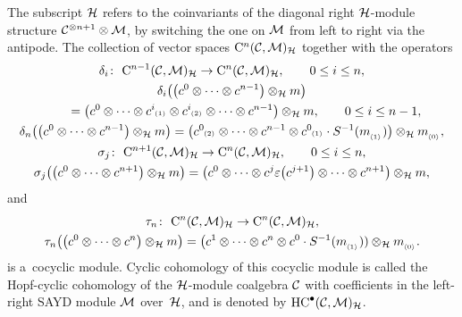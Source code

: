 \documentclass[pdftex]{sigma}
\numberwithin{equation}{section}
\newcommand{\ps}[1]{~\hspace{-4pt}_{^{(#1)}}}
\newcommand{\ns}[1]{~\hspace{-4pt}_{_{{\langle#1\rangle}}}}
\begin{document}
{\sloppy The subscript ${\cal H}$ refers to the coinvariants of the diagonal right ${\cal H}$-module structure \mbox{${\cal C}^{\otimes
n+1}\otimes{\cal M}$}, by switching the one on ${\cal M}$ from left to right via the antipode.
The collection of vector spaces ${\rm C}^n({\cal C},{\cal M})_{{\cal H}}$ together with the operators
\begin{gather*}
\delta_i\colon \ {\rm C}^{n-1}({\cal C},{\cal M})_{{\cal H}} \to {\rm C}^n({\cal C},{\cal M})_{{\cal H}},
\qquad
0 \leq i \leq n,
\\
\delta_i\big(\big(c^0 \otimes \cdots \otimes c^{n-1}\big) \otimes_{{\cal H}} m\big) \\
\qquad{} =\big(c^0 \otimes \cdots \otimes c^i\ps{1} \otimes
c^i\ps{2} \otimes \cdots \otimes c^{n-1}\big) \otimes_{{\cal H}} m,
\qquad
0 \leq i \leq n-1,
\\
\delta_n\big(\big(c^0 \otimes \cdots \otimes c^{n-1}\big) \otimes_{{\cal H}} m\big) =\big(c^0\ps{2} \otimes \cdots \otimes c^{n-1}
\otimes c^0\ps{1} \cdot S^{-1}(m\ns{1})\big) \otimes_{{\cal H}} m\ns{0},
\\
\sigma_j\colon \ {\rm C}^{n+1}({\cal C},{\cal M})_{{\cal H}} \to {\rm C}^n({\cal C},{\cal M})_{{\cal H}},
\qquad
0 \leq i \leq n,
\\
\sigma_j\big(\big(c^0 \otimes \cdots \otimes c^{n+1}\big) \otimes_{{\cal H}} m\big) =\big(c^0 \otimes \cdots \otimes
c^{j}\varepsilon\big(c^{j+1}\big) \otimes \cdots \otimes c^{n+1}\big) \otimes_{{\cal H}} m,
\end{gather*}
and
\begin{gather*}
\tau_n\colon \ {\rm C}^{n}({\cal C},{\cal M})_{{\cal H}} \to {\rm C}^n({\cal C},{\cal M})_{{\cal H}},
\\
\tau_n\big(\big(c^0 \otimes \cdots \otimes c^n\big) \otimes_{\mathcal{H}} m\big) =\big(c^1 \otimes \cdots \otimes c^n \otimes c^0 \cdot
S^{-1}(m\ns{1})) \otimes_{\mathcal{H}} m\ns{0}.
\end{gather*}
is a~cocyclic module.
Cyclic cohomology of this cocyclic module is called the Hopf-cyclic cohomology of the ${\cal H}$-module coalgebra ${\cal
C}$ with coef\/f\/icients in the left-right SAYD module ${\cal M}$ over~${\cal H}$, and is denoted by ${\rm
HC}^\bullet({\cal C},{\cal M})_{\cal H}$.

}
\end{document}
